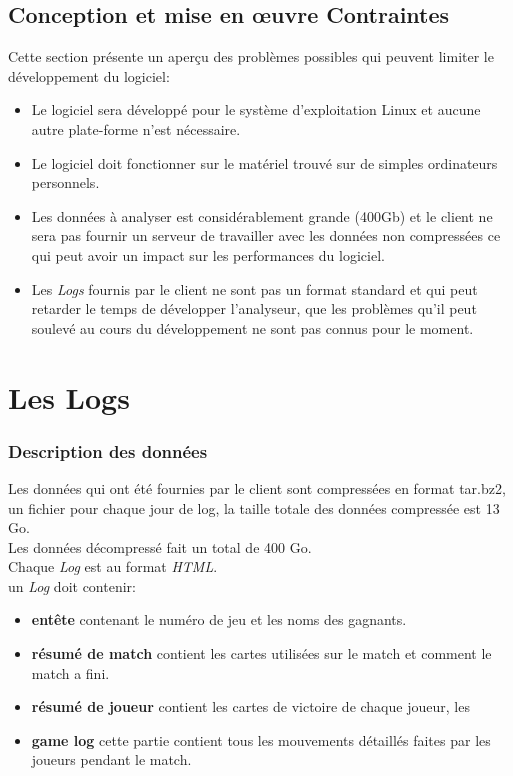 \documentclass{scrreprt}
\begin{document}
\section{Conception et mise en œuvre Contraintes}
Cette section présente un aperçu des problèmes possibles qui peuvent limiter le développement du logiciel:
\begin{itemize}
\item Le logiciel sera développé pour le système d'exploitation Linux et aucune autre plate-forme n’est nécessaire.
\item Le logiciel doit fonctionner sur le matériel trouvé sur de simples ordinateurs personnels.
\item Les données à analyser est considérablement grande (400Gb) et le client ne sera pas fournir un serveur de travailler avec les données non compressées ce qui peut avoir un impact sur les performances du logiciel.

\item Les \textit{Logs} fournis par le client ne sont pas un format standard et qui peut retarder le temps de développer l'analyseur, que les problèmes qu'il peut soulevé au cours du développement ne sont pas connus pour le moment.
\end{itemize}

\chapter{Les Logs}
\subsection{Description des données}
Les données qui ont été fournies par le client sont compressées en format tar.bz2, un fichier pour chaque jour de log, la taille totale des données compressée est 13 Go.\\
Les données décompressé fait un total de 400 Go.\\
Chaque \textit{Log} est au format \textit{HTML}.\\
un \textit{Log} doit contenir:
\begin{itemize}
  \item{\textbf{entête}} contenant le numéro de jeu et les noms des gagnants.
  \item{\textbf{résumé de  match}} contient les cartes utilisées sur le match et comment le match a fini.
  \item{\textbf{résumé de joueur}} contient  les cartes de victoire de chaque joueur, les%
  \item{\textbf{game log}} cette partie contient tous les mouvements détaillés faites par les joueurs pendant le match.

\end{itemize}
\end{document}
